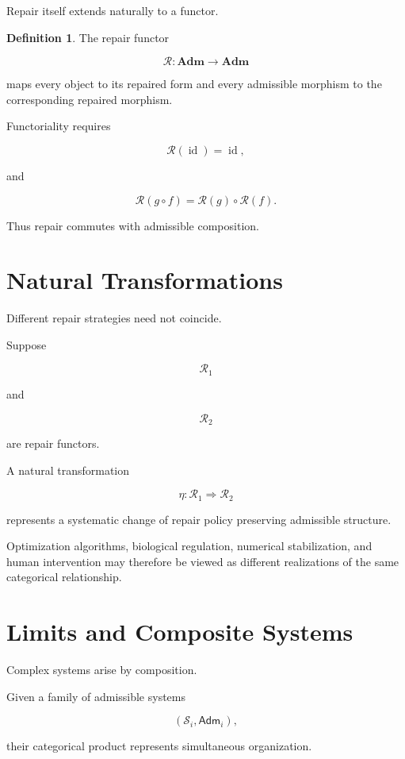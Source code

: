 \documentclass[11pt,oneside]{book}
\numberwithin{equation}{chapter}
\theoremstyle{definition}
\newtheorem{definition}{Definition}[chapter]
\theoremstyle{plain}
\DeclareMathOperator{\id}{id}
\newcommand{\State}{\mathcal{S}}
\newcommand{\Adm}{\mathsf{Adm}}
\begin{document}
Repair itself extends naturally to a functor.

\begin{definition}

The repair functor

\[
\mathcal R:
\mathbf{Adm}
\rightarrow
\mathbf{Adm}
\]

maps every object to its repaired form and every admissible morphism to the
corresponding repaired morphism.

\end{definition}

Functoriality requires

\[
\mathcal R(\id)
=
\id,
\]

and

\[
\mathcal R(g\circ f)
=
\mathcal R(g)
\circ
\mathcal R(f).
\]

Thus repair commutes with admissible composition.

\section{Natural Transformations}

Different repair strategies need not coincide.

Suppose

\[
\mathcal R_1
\]

and

\[
\mathcal R_2
\]

are repair functors.

A natural transformation

\[
\eta:
\mathcal R_1
\Rightarrow
\mathcal R_2
\]

represents a systematic change of repair policy preserving admissible
structure.

Optimization algorithms, biological regulation, numerical stabilization, and
human intervention may therefore be viewed as different realizations of the
same categorical relationship.

\section{Limits and Composite Systems}

Complex systems arise by composition.

Given a family of admissible systems

\[
(\State_i,\Adm_i),
\]

their categorical product represents simultaneous organization.
\end{document}
